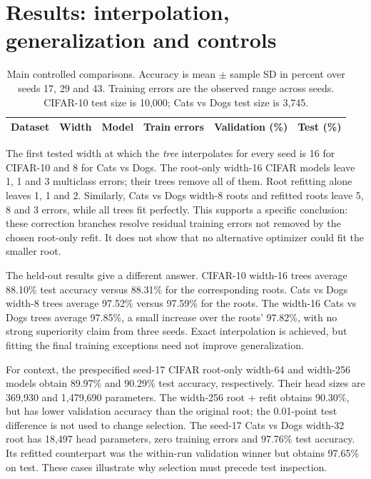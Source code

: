 \documentclass[11pt,a4paper]{article}
\begin{document}
\section{Results: interpolation, generalization and controls}\label{sec:results}
\begin{table}[H]\centering\small
\caption{Main controlled comparisons. Accuracy is mean $\pm$ sample SD in percent over seeds 17, 29 and 43. Training errors are the observed range across seeds. CIFAR-10 test size is 10,000; Cats vs Dogs test size is 3,745.}
\begin{tabular}{lllrcc}\toprule
Dataset & Width & Model & Train errors & Validation (\%) & Test (\%)\\\midrule

\end{tabular}\label{tab:main}
\end{table}
The first tested width at which the \emph{tree} interpolates for every seed is 16 for CIFAR-10 and 8 for Cats vs Dogs. The root-only width-16 CIFAR models leave 1, 1 and 3 multiclass errors; their trees remove all of them. Root refitting alone leaves 1, 1 and 2. Similarly, Cats vs Dogs width-8 roots and refitted roots leave 5, 8 and 3 errors, while all trees fit perfectly. This supports a specific conclusion: these correction branches resolve residual training errors not removed by the chosen root-only refit. It does not show that no alternative optimizer could fit the smaller root.

The held-out results give a different answer. CIFAR-10 width-16 trees average 88.10\% test accuracy versus 88.31\% for the corresponding roots. Cats vs Dogs width-8 trees average 97.52\% versus 97.59\% for the roots. The width-16 Cats vs Dogs trees average 97.85\%, a small increase over the roots' 97.82\%, with no strong superiority claim from three seeds. Exact interpolation is achieved, but fitting the final training exceptions need not improve generalization.

For context, the prespecified seed-17 CIFAR root-only width-64 and width-256 models obtain 89.97\% and 90.29\% test accuracy, respectively. Their head sizes are 369,930 and 1,479,690 parameters. The width-256 root + refit obtains 90.30\%, but has lower validation accuracy than the original root; the 0.01-point test difference is not used to change selection. The seed-17 Cats vs Dogs width-32 root has 18,497 head parameters, zero training errors and 97.76\% test accuracy. Its refitted counterpart was the within-run validation winner but obtains 97.65\% on test. These cases illustrate why selection must precede test inspection.
\end{document}
